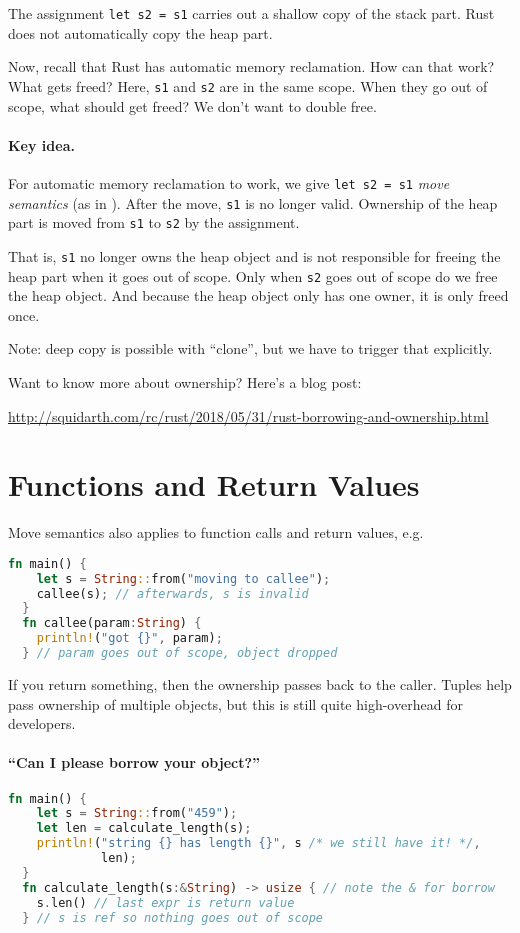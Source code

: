 The assignment {\tt let s2 = s1} carries out a shallow copy of the stack part. Rust
does not automatically copy the heap part.

Now, recall that Rust has automatic memory reclamation. How can that
work? What gets freed?  Here, {\tt s1} and {\tt s2} are in the same
scope. When they go out of scope, what should get freed? We
don't want to double free.

\paragraph{Key idea.} For automatic memory reclamation to work, we give {\tt let s2 = s1} \emph{move semantics}
(as in \CPP). After the move, {\tt s1} is no longer valid.
Ownership of the heap part is moved from {\tt s1} to {\tt s2} by the assignment.

That is, {\tt s1} no longer owns the heap object and is not responsible for freeing the heap part
when it goes out of scope. Only when {\tt s2} goes out of scope do we free the heap object.
And because the heap object only has one owner, it is only freed once.

Note: deep copy is possible with ``clone'', but we have to trigger that explicitly.

Want to know more about ownership? Here's a blog post:
\begin{center}
  \url{http://squidarth.com/rc/rust/2018/05/31/rust-borrowing-and-ownership.html}
\end{center}
\section*{Functions and Return Values}

Move semantics also applies to function calls and return values, e.g.
\begin{lstlisting}[language=Rust]
  fn main() {
    let s = String::from("moving to callee");
    callee(s); // afterwards, s is invalid
  }
  fn callee(param:String) {
    println!("got {}", param);
  } // param goes out of scope, object dropped
\end{lstlisting}
If you return something, then the ownership passes back to the caller.
Tuples help pass ownership of multiple objects, but this is still quite
high-overhead for developers.

\paragraph{``Can I please borrow your object?''}
\begin{lstlisting}[language=Rust]
  fn main() {
    let s = String::from("459");
    let len = calculate_length(s);
    println!("string {} has length {}", s /* we still have it! */,
             len);
  }
  fn calculate_length(s:&String) -> usize { // note the & for borrow
    s.len() // last expr is return value
  } // s is ref so nothing goes out of scope
\end{lstlisting}
  
